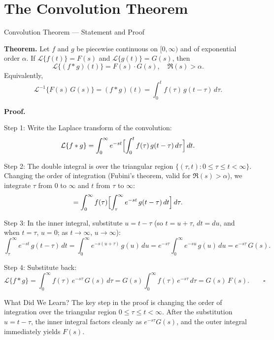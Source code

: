 \documentclass[12pt,a4paper]{article}
\begin{document}
\section{The Convolution Theorem}

\begin{infobox}{Convolution Theorem --- Statement and Proof}

\textbf{Theorem.} Let $f$ and $g$ be piecewise continuous on $[0,\infty)$ and
of exponential order $\alpha$. If $\mathcal{L}\{f(t)\} = F(s)$ and
$\mathcal{L}\{g(t)\} = G(s)$, then
\[
  \mathcal{L}\{(f * g)(t)\} = F(s)\cdot G(s), \quad \Re(s) > \alpha.
\]
Equivalently,
\[
  \mathcal{L}^{-1}\{F(s)\,G(s)\}
    = (f * g)(t)
    = \int_0^t f(\tau)\,g(t-\tau)\,d\tau.
\]

\medskip
\textbf{Proof.}

Step 1: Write the Laplace transform of the convolution:
\[
  \mathcal{L}\{f * g\}
    = \int_0^\infty e^{-st}
      \Bigl[\int_0^t f(\tau)\,g(t-\tau)\,d\tau\Bigr]\,dt.
\]

Step 2: The double integral is over the triangular region
$\{(\tau, t) : 0 \leq \tau \leq t < \infty\}$.
Changing the order of integration (Fubini's theorem, valid for $\Re(s) > \alpha$),
we integrate $\tau$ from $0$ to $\infty$ and $t$ from $\tau$ to $\infty$:
\[
  = \int_0^\infty f(\tau)
    \Bigl[\int_\tau^\infty e^{-st}\,g(t-\tau)\,dt\Bigr]\,d\tau.
\]

Step 3: In the inner integral, substitute $u = t - \tau$ (so $t = u+\tau$,
$dt = du$, and when $t = \tau$, $u = 0$; as $t \to \infty$, $u \to \infty$):
\[
  \int_\tau^\infty e^{-st}\,g(t-\tau)\,dt
    = \int_0^\infty e^{-s(u+\tau)}\,g(u)\,du
    = e^{-s\tau} \int_0^\infty e^{-su}\,g(u)\,du
    = e^{-s\tau}\,G(s).
\]

Step 4: Substitute back:
\[
  \mathcal{L}\{f * g\}
    = \int_0^\infty f(\tau)\,e^{-s\tau}\,G(s)\,d\tau
    = G(s)\int_0^\infty f(\tau)\,e^{-s\tau}\,d\tau
    = G(s)\,F(s). \qquad \square
\]
\end{infobox}

\begin{learnbox}{What Did We Learn?}
The key step in the proof is changing the order of integration over the
triangular region $0 \leq \tau \leq t < \infty$. After the substitution
$u = t-\tau$, the inner integral factors cleanly as $e^{-s\tau}G(s)$, and
the outer integral immediately yields $F(s)$.
\end{learnbox}
\end{document}
